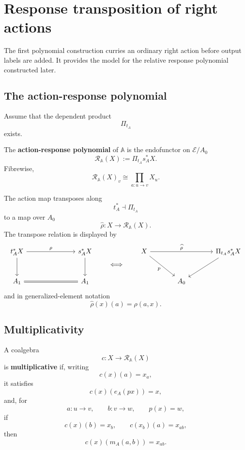 \section{Response transposition of right actions}
\label{sec:relative-response-transposition-actions}

The first polynomial construction curries an ordinary right action before
output labels are added.  It provides the model for the relative response
polynomial constructed later.

\subsection{The action-response polynomial}
\label{subsec:poly-relative-action-response-polynomial}

Assume that the dependent product
\[
\Pi_{t_A}
\]
exists.

\begin{definition}
\label{def:poly-relative-action-response-polynomial}
The \textbf{action-response polynomial} of \(\mathbb A\) is the endofunctor on
\(\mathcal E/A_0\)
\[
\mathcal R_{\mathbb A}(X)
:=
\Pi_{t_A}s_A^\ast X.
\]
Fibrewise,
\[
\mathcal R_{\mathbb A}(X)_v
\cong
\prod_{a:u\to v}X_u.
\]
\end{definition}

The action map transposes along
\[
t_A^\ast\dashv\Pi_{t_A}
\]
to a map over \(A_0\)
\[
\widehat\rho:
X\to\mathcal R_{\mathbb A}(X).
\]
The transpose relation is displayed by
\[
\begin{tikzcd}[column sep=large,row sep=large]
t_A^\ast X
  \arrow[rr,"\rho"]
  \arrow[d]
&&
s_A^\ast X
  \arrow[d]
\\
A_1
  \arrow[rr,equal]
&&
A_1
\end{tikzcd}
\qquad\Longleftrightarrow\qquad
\begin{tikzcd}[column sep=large,row sep=large]
X
  \arrow[rr,"\widehat\rho"]
  \arrow[dr,"p"']
&&
\Pi_{t_A}s_A^\ast X
  \arrow[dl]
\\
&
A_0
&
\end{tikzcd}
\]
and in generalized-element notation
\[
\widehat\rho(x)(a)=\rho(a,x).
\]

\subsection{Multiplicativity}
\label{subsec:poly-relative-action-response-multiplicativity}

\begin{definition}
\label{def:poly-relative-multiplicative-action-coalgebra}
A coalgebra
\[
c:X\to\mathcal R_{\mathbb A}(X)
\]
is \textbf{multiplicative} if, writing
\[
c(x)(a)=x_a,
\]
it satisfies
\[
c(x)(e_A(px))=x,
\]
and, for
\[
a:u\to v,
\qquad
b:v\to w,
\qquad
p(x)=w,
\]
if
\[
c(x)(b)=x_b,
\qquad
c(x_b)(a)=x_{ab},
\]
then
\[
c(x)(m_A(a,b))=x_{ab}.
\]
\end{definition}

